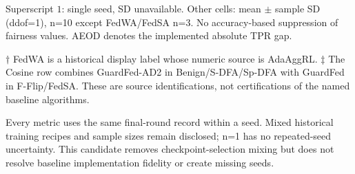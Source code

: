 \begin{minipage}{\linewidth}\footnotesize
Superscript $1$: single seed, SD unavailable. Other cells: mean $\pm$ sample SD (ddof=1), n=10 except FedWA/FedSA n=3. No accuracy-based suppression of fairness values. AEOD denotes the implemented absolute TPR gap.
\par $\dagger$ FedWA is a historical display label whose numeric source is AdaAggRL. $\ddagger$ The Cosine row combines GuardFed-AD2 in Benign/S-DFA/Sp-DFA with GuardFed in F-Flip/FedSA. These are source identifications, not certifications of the named baseline algorithms.
\par Every metric uses the same final-round record within a seed. Mixed historical training recipes and sample sizes remain disclosed; n=1 has no repeated-seed uncertainty. This candidate removes checkpoint-selection mixing but does not resolve baseline implementation fidelity or create missing seeds.
\end{minipage}
